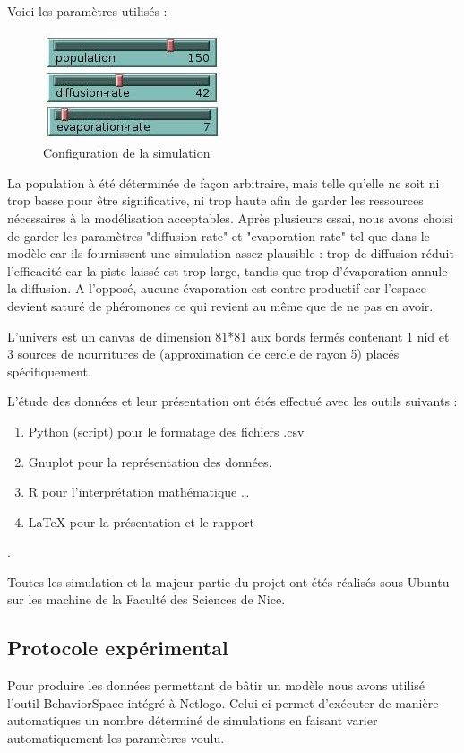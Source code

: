 \documentclass{article}
\begin{document}
Voici les paramètres utilisés :
\begin{figure}[H]
\centering
\includegraphics[scale=0.6]{contenu/settings.jpg} 
\caption{Configuration de la simulation}
\label{fig:Tas}
\end{figure}

La population à été déterminée de façon arbitraire, mais telle qu'elle ne soit ni trop basse pour être significative, ni trop haute afin de garder les ressources nécessaires à la modélisation acceptables. Après plusieurs essai, nous avons choisi de garder les paramètres "diffusion-rate" et "evaporation-rate" tel que dans le modèle car ils fournissent une simulation assez plausible : trop de diffusion réduit l'efficacité car la piste laissé est trop large, tandis que trop d'évaporation annule la diffusion. A l'opposé, aucune évaporation est contre productif car l'espace devient saturé de phéromones ce qui revient au même que de ne pas en avoir.

L'univers est un canvas de dimension 81*81 aux bords fermés contenant 1 nid et 3 sources de nourritures de (approximation de cercle de rayon 5) placés spécifiquement.

L'étude des données et leur présentation ont étés effectué avec les outils suivants :
\begin{enumerate}  
\item Python (script) pour le formatage des fichiers .csv
\item Gnuplot pour la représentation des données.
\item R pour l'interprétation mathématique  \ldots 
\item \LaTeX\xspace pour la présentation et le rapport %
\end{enumerate}.

Toutes les simulation et la majeur partie du projet ont étés réalisés sous Ubuntu sur les machine de la Faculté des Sciences de Nice. 


\label{pourcentage}

\subsection{Protocole expérimental}
Pour produire les données permettant de bâtir un modèle nous avons utilisé l'outil BehaviorSpace intégré à Netlogo. Celui ci permet d'exécuter de manière automatiques un nombre déterminé de simulations en faisant varier automatiquement les paramètres voulu.
\end{document}
